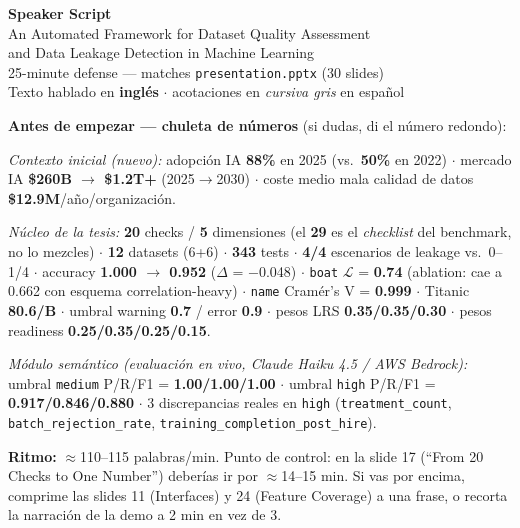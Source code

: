 \documentclass[11pt,a4paper]{article}
\newcommand{\keynum}[1]{\textbf{\color{upmBlue}#1}}
\begin{document}
\begin{center}
{\LARGE\bfseries\color{upmBlue} Speaker Script}\\[4pt]
{\large An Automated Framework for Dataset Quality Assessment\\
and Data Leakage Detection in Machine Learning}\\[6pt]
{\color{grayTxt} 25-minute defense --- matches \texttt{presentation.pptx} (30 slides)\\
Texto hablado en \textbf{inglés} $\cdot$ acotaciones en \textit{cursiva gris} en español}
\end{center}

\vspace{4pt}
\begin{mdframed}[backgroundcolor=paleOrange, linecolor=upmOrange, linewidth=1pt, roundcorner=4pt]
\textbf{\color{upmBlue}Antes de empezar --- chuleta de números} (si dudas, di el número redondo):

\textit{Contexto inicial (nuevo):} adopción IA \keynum{88\%} en 2025 (vs.\ \keynum{50\%} en 2022) $\cdot$
mercado IA \keynum{\$260B $\rightarrow$ \$1.2T+} (2025$\rightarrow$2030) $\cdot$
coste medio mala calidad de datos \keynum{\$12.9M}/año/organización.

\textit{Núcleo de la tesis:}
\keynum{20} checks / \keynum{5} dimensiones (el \keynum{29} es el \emph{checklist} del benchmark, no lo mezcles) $\cdot$
\keynum{12} datasets (6+6) $\cdot$ \keynum{343} tests $\cdot$
\keynum{4/4} escenarios de leakage vs.\ 0--1/4 $\cdot$
accuracy \keynum{1.000 $\rightarrow$ 0.952} ($\Delta$ = $-$0.048) $\cdot$
\texttt{boat} $\mathcal{L}$ = \keynum{0.74} (ablation: cae a 0.662 con esquema correlation-heavy) $\cdot$
\texttt{name} Cramér's V = \keynum{0.999} $\cdot$ Titanic \keynum{80.6/B} $\cdot$
umbral warning \keynum{0.7} / error \keynum{0.9} $\cdot$
pesos LRS \keynum{0.35/0.35/0.30} $\cdot$ pesos readiness \keynum{0.25/0.35/0.25/0.15}.

\textit{Módulo semántico (evaluación en vivo, Claude Haiku 4.5 / AWS Bedrock):}
umbral \texttt{medium} P/R/F1 = \keynum{1.00/1.00/1.00} $\cdot$ umbral \texttt{high}
P/R/F1 = \keynum{0.917/0.846/0.880} $\cdot$ 3 discrepancias reales en \texttt{high}
(\texttt{treatment\_count}, \texttt{batch\_rejection\_rate},
\texttt{training\_completion\_post\_hire}).

\textbf{Ritmo:} $\approx$110--115 palabras/min. Punto de control: en la slide 17
(``From 20 Checks to One Number'') deberías ir por $\approx$14--15 min. Si vas por
encima, comprime las slides 11 (Interfaces) y 24 (Feature Coverage) a una frase,
o recorta la narración de la demo a 2 min en vez de 3.
\end{mdframed}
\end{document}
